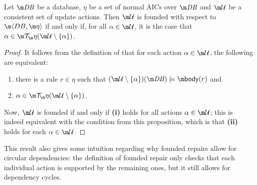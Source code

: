 \begin{proposition}
  \label{lem:founded-char}
  Let $\db$ be a database, $\eta$ be a set of normal AICs over $\db$ and $\UU$ be a consistent set of update actions.
  Then $\UU$ is founded with respect to $\fulldb$ if and only if, for all $\alpha\in\UU$, it is the case that $\alpha\in\Op(\UU\setminus\{\alpha\})$.
\end{proposition}
\begin{proof}
  It follows from the definition of \Op that for each action $\alpha\in \UU$, the following are equivalent:
  \begin{enumerate}
   \item there is a rule $r\in\eta$ such that $(\UU\setminus\{\alpha\})(\db)\models\body(r)$ and 
   \item $\alpha\in\Op(\UU\setminus\{\alpha\})$.
  \end{enumerate}
  Now, $\UU$ is founded if and only if \textbf{(i)} holds for all actions $\alpha\in \UU$; this is indeed equivalent with the condition from this proposition, which is that \textbf{(ii)} holds for each $\alpha\in \UU$. 
\end{proof} 

This result also gives some intuition regarding why founded repairs allow for circular dependencies: the definition of founded repair only checks that each individual action is supported by the remaining ones, but it still allows for dependency cycles.

